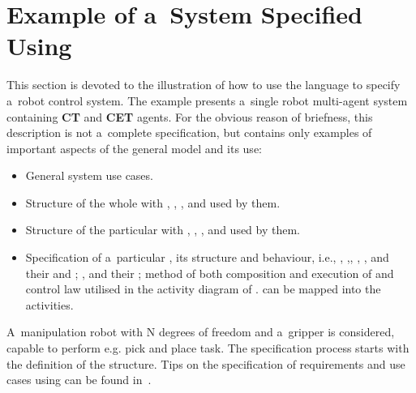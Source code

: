 \documentclass[11pt,oneside,a4paper]{article}
\begin{document}
	\section{Example of a~System Specified Using \EARL}
	\label{sec:example}
	This section is devoted to the illustration of how to use the \EARL{} language to specify a~robot control system. The example presents a~single robot multi-agent system
	containing \textbf{CT} and \textbf{CET} agents. For the obvious reason of briefness, this description is not a~complete specification, but contains only examples of
	important aspects of the general model and its use:
	\begin{itemize}
		\item General system use cases.
		\item Structure of the whole \System{} with \Buffers{}, \InternalMemories{}, \InterAgentCommunicationLinks{}, and \ValueTypes{} used by them.
		\item Structure of the particular \Agent{} with \Buffers, \InternalMemories{}, \InterSubsystemCommunicationLinks{}, and \ValueTypes{} used by them.
		\item Specification of a~particular \Subsystem{}, its structure and behaviour, i.e., \Buffers{}, \InternalMemories{},\TransitionFunctionCompositionVariables{}, \ValueTypes{}, \Fsm{}, \BasicBehaviours{} and their
		\TerminalConditions{} and \ErrorConditions{}; \Predicates{}, \FsmTransitions{} and their \InitialConditions{}; method of both composition and execution
		of \PrimitiveTransitionFunctions{} and control law utilised in the activity diagram of \PrimitiveTransitionFunction{}. \PrimitiveTransitionFunctions{} can be mapped into the \SysML{} activities.
	\end{itemize}
	
	A~manipulation robot with N degrees of freedom and a~gripper is considered, capable to perform e.g. pick and place task. The specification process starts with the definition of the \System{} structure.
	Tips on the specification of requirements and use cases using \SysML{} can be found in~\cite{requc1,requc2}.
	
	
\end{document}
